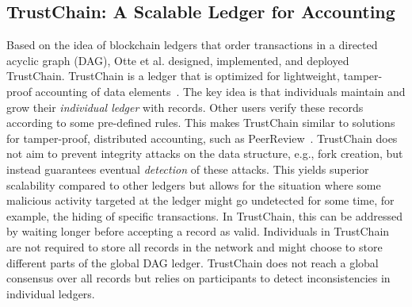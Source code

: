 \subsection{TrustChain: A Scalable Ledger for Accounting} \label{sec:trustchain}
Based on the idea of blockchain ledgers that order transactions in a directed acyclic graph (DAG), Otte et al. designed, implemented, and deployed TrustChain.
TrustChain is a ledger that is optimized for lightweight, tamper-proof accounting of data elements~\cite{otte2017trustchain}.
The key idea is that individuals maintain and grow their \emph{individual ledger} with records.
Other users verify these records according to some pre-defined rules.
This makes TrustChain similar to solutions for tamper-proof, distributed accounting, such as PeerReview~\cite{haeberlen2007peerreview}.
TrustChain does not aim to prevent integrity attacks on the data structure, e.g., fork creation, but instead guarantees eventual \emph{detection} of these attacks.
This yields superior scalability compared to other ledgers but allows for the situation where some malicious activity targeted at the ledger might go undetected for some time, for example, the hiding of specific transactions.
In TrustChain, this can be addressed by waiting longer before accepting a record as valid.
Individuals in TrustChain are not required to store all records in the network and might choose to store different parts of the global DAG ledger.
TrustChain does not reach a global consensus over all records but relies on participants to detect inconsistencies in individual ledgers.

